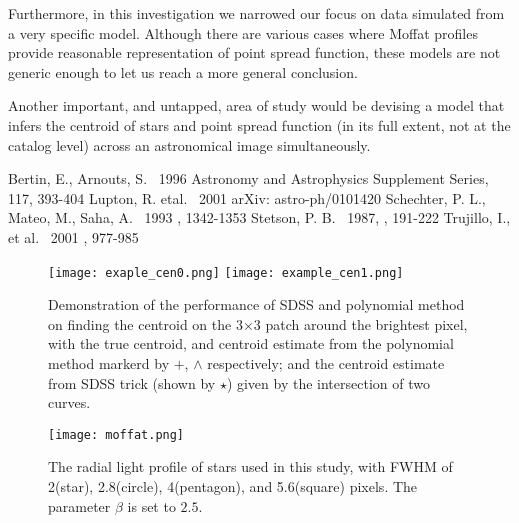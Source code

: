 \documentclass[12pt, preprint]{aastex}
\begin{document}
Furthermore, in this investigation we narrowed our focus on data simulated from a very specific model. Although there are various cases where Moffat profiles provide reasonable representation of point spread function, these models are not generic enough to let us reach a more general conclusion. 

Another important, and untapped, area of study would be devising a model that infers the centroid of stars and point spread function (in its full extent, not at the catalog level) across an astronomical image simultaneously. 




\begin{thebibliography}{70}

 Bertin, E., Arnouts, S. \ 1996  Astronomy and Astrophysics Supplement Series, 117, 393-404
 Lupton, R. etal. \ 2001  arXiv: astro-ph/0101420
 Schechter, P. L., Mateo, M., Saha, A. \ 1993 \pasp, 1342-1353
 Stetson, P. B. \ 1987, \pasp, 191-222
 Trujillo, I., et al. \ 2001 \mnras, 977-985

\end{thebibliography}

\clearpage




\begin{figure}[!htb]
  \texttt{[image: exaple\_cen0.png]}
\endminipage
{}
  \texttt{[image: example\_cen1.png]}
\endminipage
\caption{Demonstration of the performance of SDSS and polynomial method on finding the centroid on the 3$\times$3 patch around the brightest pixel, with the true centroid, and centroid estimate from the polynomial method markerd by $+$, $\wedge$ respectively; and the centroid estimate from SDSS trick (shown by $\star$) given by the intersection of two curves.}\label{ex}
\end{figure}


\begin{figure}[!htb]
  \texttt{[image: moffat.png]}
\endminipage
\caption{The radial light profile of stars used in this study, with FWHM of 2(star), 2.8(circle), 4(pentagon), and 5.6(square) pixels. The parameter $\beta$ is set to $2.5$.}\label{moffat}
\end{figure}
\end{document}
